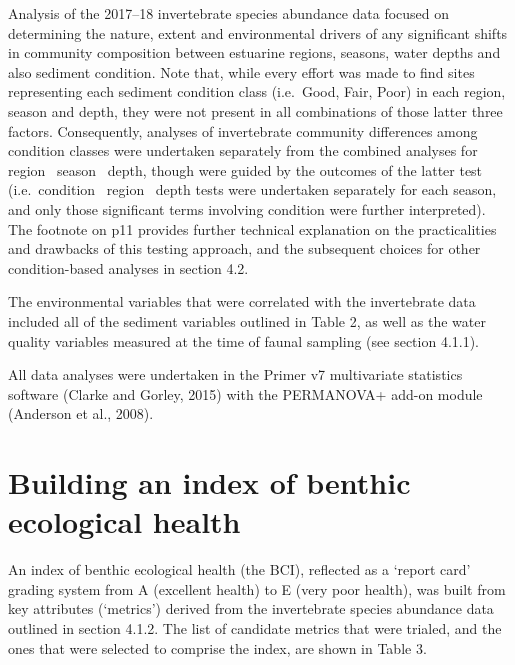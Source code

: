 \documentclass[
]{book}
\begin{document}
Analysis of the 2017--18 invertebrate species abundance data focused on determining the nature, extent and environmental drivers of any significant shifts in community composition between estuarine regions, seasons, water depths and also sediment condition. Note that, while every effort was made to find sites representing each sediment condition class (i.e.~Good, Fair, Poor) in each region, season and depth, they were not present in all combinations of those latter three factors. Consequently, analyses of invertebrate community differences among condition classes were undertaken separately from the combined analyses for region~ season~ depth, though were guided by the outcomes of the latter test (i.e.~condition~ region~ depth tests were undertaken separately for each season, and only those significant terms involving condition were further interpreted). The footnote on p11 provides further technical explanation on the practicalities and drawbacks of this testing approach, and the subsequent choices for other condition-based analyses in section 4.2.~

The environmental variables that were correlated with the invertebrate data included all of the sediment variables outlined in Table 2, as well as the water quality variables measured at the time of faunal sampling (see section 4.1.1).

All data analyses were undertaken in the Primer v7 multivariate statistics software (Clarke and Gorley, 2015) with the PERMANOVA+ add-on module (Anderson et al., 2008).

\hypertarget{building-an-index-of-benthic-ecological-health}{%
\section{Building an index of benthic ecological health}\label{building-an-index-of-benthic-ecological-health}}

An index of benthic ecological health (the BCI), reflected as a `report card' grading system from A (excellent health) to E (very poor health), was built from key attributes (`metrics') derived from the invertebrate species abundance data outlined in section 4.1.2. The list of candidate metrics that were trialed, and the ones that were selected to comprise the index, are shown in Table 3.
\end{document}
